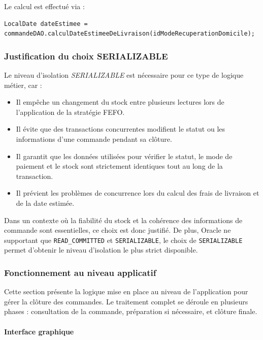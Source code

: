 Le calcul est effectué via :

\begin{verbatim}
LocalDate dateEstimee = commandeDAO.calculDateEstimeeDeLivraison(idModeRecuperationDomicile);
\end{verbatim}

\subsubsection{Justification du choix SERIALIZABLE}

Le niveau d'isolation \textit{SERIALIZABLE} est nécessaire pour ce type de logique métier, car :

\begin{itemize}
    \item Il empêche un changement du stock entre plusieurs lectures lors de l'application de la stratégie FEFO.
    \item Il évite que des transactions concurrentes modifient le statut ou les informations d'une commande pendant sa clôture.
    \item Il garantit que les données utilisées pour vérifier le statut, le mode de paiement et le stock sont strictement identiques tout au long de la transaction.
    \item Il prévient les problèmes de concurrence lors du calcul des frais de livraison et de la date estimée.
\end{itemize}

Dans un contexte où la fiabilité du stock et la cohérence des informations de commande sont essentielles, ce choix est donc justifié. De plus, Oracle ne supportant que \texttt{READ_COMMITTED} et \texttt{SERIALIZABLE}, le choix de \texttt{SERIALIZABLE} permet d'obtenir le niveau d'isolation le plus strict disponible.

\subsubsection{Fonctionnement au niveau applicatif}

Cette section présente la logique mise en place au niveau de l'application pour gérer la clôture des commandes. Le traitement complet se déroule en plusieurs phases : consultation de la commande, préparation si nécessaire, et clôture finale.

\paragraph{Interface graphique}

